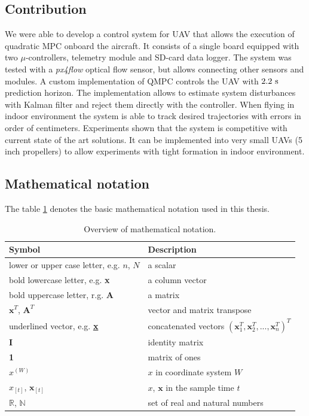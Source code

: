 \subsection{Contribution}

We were able to develop a control system for UAV that allows the execution of quadratic MPC onboard the aircraft. It consists of a single board equipped with two $\mu$-controllers, telemetry module and SD-card data logger. The system was tested with a \textit{px4flow} optical flow sensor, but allows connecting other sensors and modules. A custom implementation of QMPC controls the UAV with $2.2~\mathrm{s}$ prediction horizon. The implementation allows to estimate system disturbances with Kalman filter and reject them directly with the controller. When flying in indoor environment the system is able to track desired trajectories with errors in order of centimeters. Experiments shown that the system is competitive with current state of the art solutions. It can be implemented into very small UAVs (5 inch propellers) to allow experiments with tight formation in indoor environment.

\subsection{Mathematical notation}

The table \ref{tab:notation} denotes the basic mathematical notation used in this thesis.

\begin{table}[h]
\centering
\begin{tabular}{ll}
\hline
Symbol & Description \\
\hline
lower or upper case letter, e.g. $n$, $N$ & a scalar \\
bold lowercase letter, e.g. \textbf{x} & a column vector \\ 
bold uppercase letter, r.g. \textbf{A} & a matrix \\
$\textbf{x}^T$, $\textbf{A}^T$ & vector and matrix transpose \\
underlined vector, e.g. \textbf{\underline{x}} & concatenated vectors $\left(\textbf{x}_1^T,\textbf{x}_2^T,...,\textbf{x}_n^T\right)^T$ \\
\textbf{I} & identity matrix \\
\textbf{1} & matrix of ones \\
$x^{(W)}$ & $x$ in coordinate system $W$ \\ 
$x_{[t]}$, $\textbf{x}_{[t]}$ & $x$, $\textbf{x}$ in the sample time $t$ \\
$\mathbb{R}$, $\mathbb{N}$ & set of real and natural numbers \\
\hline
\end{tabular}
\caption{Overview of mathematical notation.}
\label{tab:notation}
\end{table}

